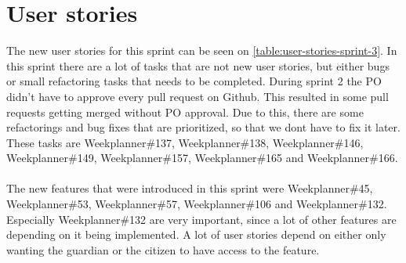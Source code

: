 \section{User stories}
The new user stories for this sprint can be seen on \autoref{table:user-stories-sprint-3}.
In this sprint there are a lot of tasks that are not new user stories, but either bugs or small refactoring tasks that needs to be completed.
During sprint 2 the PO didn't have to approve every pull request on Github. 
This resulted in some pull requests getting merged without PO approval.
Due to this, there are some refactorings and bug fixes that are prioritized, so that we dont have to fix it later.
These tasks are Weekplanner\#137, Weekplanner\#138, Weekplanner\#146, Weekplanner\#149, Weekplanner\#157, Weekplanner\#165 and Weekplanner\#166.
\\\\
The new features that were introduced in this sprint were Weekplanner\#45, Weekplanner\#53, Weekplanner\#57, Weekplanner\#106 and Weekplanner\#132.
Especially Weekplanner\#132 are very important, since a lot of other features are depending on it being implemented. 
A lot of user stories depend on either only wanting the guardian or the citizen to have access to the feature.

